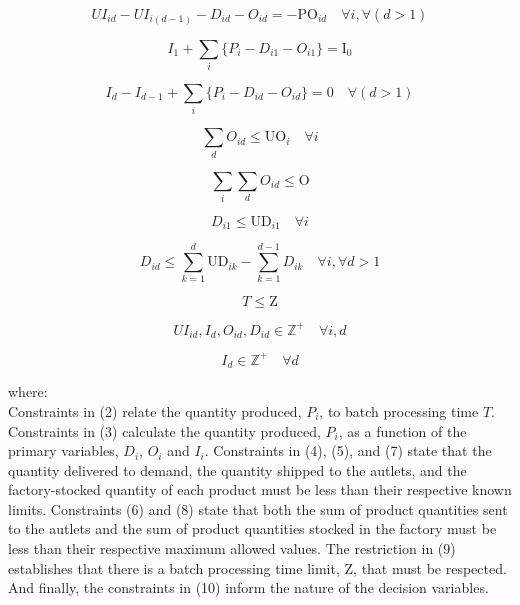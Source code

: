 \documentclass[authoryear,preprint,12pt]{elsarticle}
\begin{document}
\begin{equation}
UI_{id} - UI_{i(d-1)} - D_{id} - O_{id} = - \textrm{PO}_{id} \quad \forall i, \forall (d>1)
\end{equation}

\begin{equation}
I_{1} + \sum_{i}\{P_i -  D_{i1} - O_{i1}\} = \textrm{I}_{0} 
\end{equation}

\begin{equation}
I_{d} - I_{d-1} + \sum_{i}\{P_i -  D_{id} - O_{id}\} = 0 \quad \forall (d>1)
\end{equation}

\begin{equation}
\sum_{d}{O_{id}} \leq \textrm{UO}_i \quad \forall i
\end{equation}

\begin{equation}
\sum_{i}{\sum_{d}{O_{id}}} \leq \textrm{O}
\end{equation}

\begin{equation}
D_{i1} \leq \textrm{UD}_{i1} \quad \forall i
\end{equation}

\begin{equation}
D_{id} \leq \sum_{k=1}^{d}{\textrm{UD}_{ik}} - \sum_{k=1}^{d-1}{D_{ik}}  \quad \forall i, \forall d>1
\end{equation}

\begin{equation}
T \leq \textrm{Z}
\end{equation}

\begin{equation}
UI_{id}, I_{d}, O_{id}, D_{id} \in  \mathbb{Z}^+ \quad \forall i,d
\end{equation}

\begin{equation}
I_{d} \in  \mathbb{Z}^+ \quad \forall d
\end{equation}

where: \\

Constraints in (2) relate the quantity produced, $P_i$, to batch processing time $T$. Constraints in (3) calculate the quantity produced, $P_i$, as a function of the primary variables, $D_i$, $O_i$ and $I_i$. Constraints in (4), (5), and (7) state that the quantity delivered to demand, the quantity shipped to the autlets, and the factory-stocked quantity of each product must be less than their respective known limits. Constraints (6) and (8) state that both the sum of product quantities sent to the autlets and the sum of product quantities stocked in the factory must be less than their respective maximum allowed values. The restriction in (9) establishes that there is a batch processing time limit, $\textrm{Z}$, that must be respected. And finally, the constraints in (10) inform the nature of the decision variables.
\end{document}
